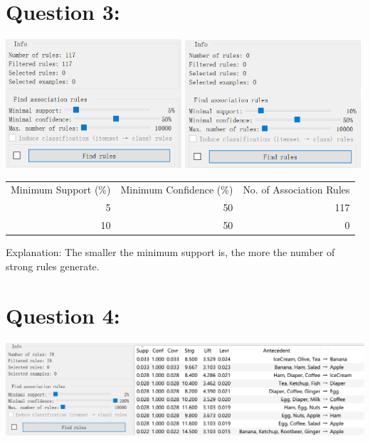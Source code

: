 \documentclass[titlepage]{article}
\begin{document}
\section{Question 3:}
\label{sec:orgb704839}
\begin{center}
\includegraphics[width=0.49\textwidth]{minsup5_mincon50.PNG}
\includegraphics[width=0.49\textwidth]{minsup10_mincon50.PNG}
\end{center}

\begin{center}
\begin{tabular}{rrr}
\hline
Minimum Support (\%) & Minimum Confidence (\%) & No. of Association Rules\\
5 & 50 & 117\\
10 & 50 & 0\\
\hline
\end{tabular}
\end{center}

Explanation: The smaller the minimum support is, the more the number of strong rules generate.

\section{Question 4:}
\label{sec:org278a48c}
\begin{center}
\begin{center}
\includegraphics[width=.9\linewidth]{mincon100_3.PNG}
\end{center}
\end{center}
\end{document}
